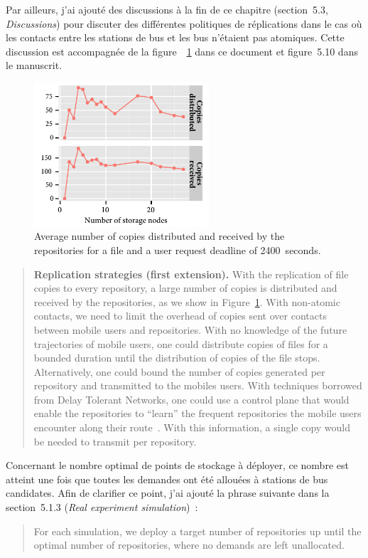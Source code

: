 \documentclass[11pt]{article}
\begin{document}
Par ailleurs, j'ai ajouté des discussions à la fin de ce chapitre (section~5.3, \textit{Discussions}) pour discuter des différentes politiques de réplications dans le cas où les contacts entre les stations de bus et les bus n'étaient pas atomiques. Cette discussion est accompagnée de la figure~~\ref{fig:allput-backend} dans ce document et figure~5.10 dans le manuscrit.

\begin{figure}
    \centering
    \includegraphics[width=6.5cm]{figures/allput-backend.pdf}
    \caption{Average number of copies distributed and received by the repositories for a file and a user request deadline of 2400~seconds.}
    \label{fig:allput-backend}
\end{figure}

\begin{quote}
\noindent\textbf{Replication strategies (first extension).} With the replication of file copies to every repository, a large number of copies is distributed and received by the repositories, as we show in Figure~\ref{fig:allput-backend}. With non-atomic contacts, we need to limit the overhead of copies sent over contacts between mobile users and repositories. With no knowledge of the future trajectories of mobile users, one could distribute copies of files for a bounded duration until the distribution of copies of the file stops. Alternatively, one could bound the number of copies generated per repository and transmitted to the mobiles users. With techniques borrowed from Delay Tolerant Networks, one could use a control plane that would enable the repositories to ``learn'' the frequent repositories the mobile users encounter along their route~\cite{lindgren2003probabilistic,grossglauser2006locating}. With this information, a single copy would be needed to transmit per repository.
\end{quote}

Concernant le nombre optimal de points de stockage à déployer, ce nombre est atteint une fois que toutes les demandes ont été allouées à stations de bus candidates. Afin de clarifier ce point, j'ai ajouté la phrase suivante dans la section~5.1.3 (\textit{Real experiment simulation})~:
\begin{quote}
For each simulation, we deploy a target number of repositories up until the optimal number of repositories, where no demands are left unallocated. 
\end{quote}
\end{document}
